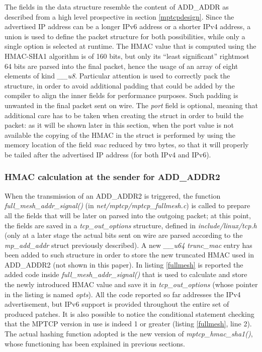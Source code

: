 The fields in the data structure resemble the content of ADD\_ADDR as described from a high level prospective in section \ref{mptcpdesign}.
Since the advertised IP address can be a longer IPv6 address or a shorter IPv4 address, a union is used to define the packet structure for both possibilities, while only a single option is selected at runtime.
The HMAC value that is computed using the HMAC-SHA1 algorithm is of 160 bits, but only its ``least significant'' rightmost 64 bits are parsed into the final packet, hence the usage of an array of eight elements of kind \textit{\_\_u8}.
Particular attention is used to correctly pack the structure, in order to avoid additional padding that could be added by the compiler to align the inner fields for performance purposes. Such padding is unwanted in the final packet sent on wire. The \textit{port} field is optional, meaning that additional care has to be taken when creating the struct in order to build the packet: as it will be shown later in this section, when the port value is not available the copying of the HMAC in the struct is performed by using the memory location of the field \textit{mac} reduced by two bytes, so that it will properly be tailed after the advertised IP address (for both IPv4 and IPv6). 

\subsubsection{HMAC calculation at the sender for ADD\_ADDR2}
When the transmission of an ADD\_ADDR2 is triggered, the function \textit{full\_mesh\_addr\_signal()} (in \textit{net/mptcp/mptcp\_fullmesh.c}) is called to prepare all the fields that will be later on parsed into the outgoing packet; at this point, the fields are saved in a \textit{tcp\_out\_options} structure, defined in \textit{include/linux/tcp.h} (only at a later stage the actual bits sent on wire are parsed according to the \textit{mp\_add\_addr} struct previously described). A new \textit{\_\_u64 trunc\_mac} entry has been added to such structure in order to store the new truncated HMAC used in ADD\_ADDR2 (not shown in this paper).
In listing \ref{fullmesh} is reported the added code inside \textit{full\_mesh\_addr\_signal()} that is used to calculate and store the newly introduced HMAC value and save it in \textit{tcp\_out\_options} (whose pointer in the listing is named \textit{opts}). All the code reported so far addresses the IPv4 advertisement, but IPv6 support is provided throughout the entire set of produced patches. It is also possible to notice the conditional statement checking that the MPTCP version in use is indeed 1 or greater (listing \ref{fullmesh}, line 2). The actual hashing function adopted is the new version of \textit{mptcp\_hmac\_sha1()}, whose functioning has been explained in previous sections.

